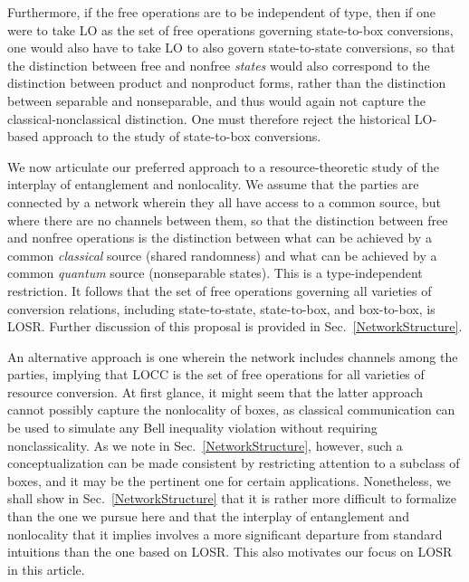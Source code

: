 \documentclass[prx,11pt,letterpaper,twocolumn,accepted=2023-11-27]{quantumarticle}
\theoremstyle{plain}
\theoremstyle{definition}
\begin{document}
Furthermore, if the free operations are to be independent of type, 
then if one were to take LO as the set of free operations governing state-to-box conversions, one would also have to take LO to also govern state-to-state conversions, so that the distinction between free and nonfree {\em states} would also correspond to the distinction between product and nonproduct forms, rather than the distinction between separable and nonseparable, and thus would again not capture the classical-nonclassical distinction.  One must therefore reject the historical LO-based approach to the study of state-to-box conversions.

  

We now articulate our preferred approach to a resource-theoretic study of the interplay of entanglement and nonlocality.  We assume that the parties are connected by a network wherein they all have access to a common source, but where there are no channels between them, so that the distinction between free and nonfree operations is the distinction between what can be achieved by a common {\em classical} source (shared randomness) and what can be achieved by a common {\em quantum} source (nonseparable states).
This is a type-independent restriction. It follows that the set of free operations governing all varieties of conversion relations, including state-to-state, state-to-box, and box-to-box, is LOSR.  Further discussion of this proposal is provided in Sec.~\ref{NetworkStructure}.
 
An alternative approach  is one wherein the network includes channels among the parties, implying that LOCC is the set of free operations for all varieties of resource conversion.   At first glance, it might seem that the latter approach cannot possibly capture
  the nonlocality of boxes, as classical communication can be used to simulate any Bell inequality violation without requiring nonclassicality.  As we note in Sec.~\ref{NetworkStructure}, however, such a conceptualization can be made consistent by restricting attention to 
   a subclass of boxes, and it may be the pertinent one for certain applications.  Nonetheless, we shall show in Sec.~\ref{NetworkStructure} that it is rather more difficult to formalize than the one we pursue here and that the interplay of entanglement and nonlocality that it implies involves a more significant departure from standard intuitions than the one based on LOSR.  This also motivates our focus on LOSR in this article.
\end{document}
